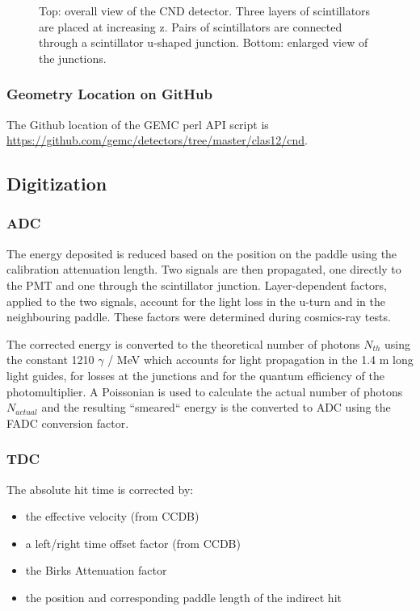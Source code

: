 \begin{figure}
	\caption{Top: overall view of the CND detector. Three layers of scintillators are placed at increasing z. Pairs of scintillators
            are connected through a scintillator u-shaped junction. Bottom: enlarged view of the junctions. }
	\label{fig:cndGeometry}
\end{figure}


\subsubsection{Geometry Location on GitHub}
The Github location of the GEMC perl API script is \url{https://github.com/gemc/detectors/tree/master/clas12/cnd}.


\subsection{Digitization}

\subsubsection{ADC}

The energy deposited is reduced based on the position on the paddle using the calibration attenuation length. Two signals are then propagated, one directly
to the PMT and one through the scintillator junction.
Layer-dependent factors, applied to the two  signals, account for the light loss in the u-turn and in the neighbouring paddle.
These factors were determined during cosmics-ray tests.

The corrected energy is converted to the theoretical number of photons $N_{th}$ using the constant 1210 $\gamma$ / MeV which accounts for light
propagation in the 1.4 m long light guides, for losses at the junctions and for the quantum efficiency of the photomultiplier.
A Poissonian is used to
calculate the actual number of photons $N_{actual}$ and the resulting ``smeared`` energy is the converted to ADC using the FADC conversion factor.

\subsubsection{TDC}

The absolute hit time is corrected by:

\begin{itemize}
	\item the effective velocity (from CCDB)
	\item a left/right time offset factor (from CCDB)
	\item the Birks Attenuation factor
	\item the position and corresponding paddle length of the indirect hit
\end{itemize}

